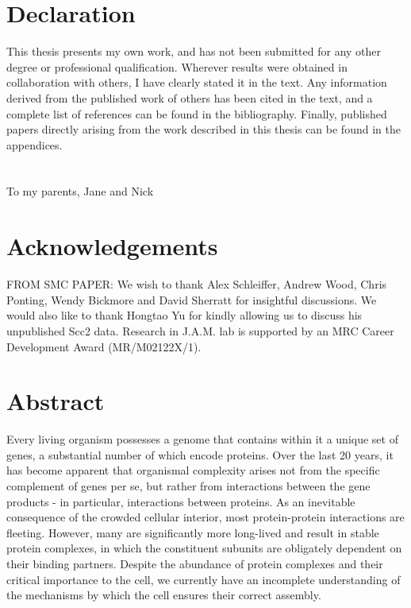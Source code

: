 \documentclass[a4paper,11pt,twoside,openright]{scrbook}
\begin{document}
\chapter*{Declaration}
This thesis presents my own work, and has not been submitted for any other degree or professional qualification. Wherever results were obtained in collaboration with others, I have clearly stated it in the text. Any information derived from the published work of others has been cited in the text, and a complete list of references can be found in the bibliography. Finally, published papers directly arising from the work described in this thesis can be found in the appendices.

\chapter*{}
To my parents, Jane and Nick

\chapter*{Acknowledgements}
FROM SMC PAPER: We wish to thank Alex Schleiffer, Andrew Wood, Chris Ponting, Wendy Bickmore and David Sherratt for insightful discussions. We would also like to thank Hongtao Yu for kindly allowing us to discuss his unpublished Scc2 data. Research in J.A.M. lab is supported by an MRC Career Development Award (MR/M02122X/1).

\chapter*{Abstract}
Every living organism possesses a genome that contains within it a unique set of genes, a substantial number of which encode proteins. Over the last 20 years, it has become apparent that organismal complexity arises not from the specific complement of genes per se, but rather from interactions between the gene products - in particular, interactions between proteins. As an inevitable consequence of the crowded cellular interior, most protein-protein interactions are fleeting. However, many are significantly more long-lived and result in stable protein complexes, in which the constituent subunits are obligately dependent on their binding partners. Despite the abundance of protein complexes and their critical importance to the cell, we currently have an incomplete understanding of the mechanisms by which the cell ensures their correct assembly.
\end{document}
